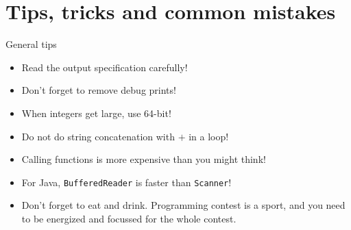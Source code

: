 \documentclass[11pt,pdf, aspectratio=169]{beamer}
\begin{document}
  \section{Tips, tricks and common mistakes}
  \begin{frame}{General tips}
    \begin{itemize}
      \item Read the output specification carefully!
      \item Don’t forget to remove debug prints!
      \item When integers get large, use 64-bit!
      \item Do not do string concatenation with $+$ in a loop!
      \item Calling functions is more expensive than you might think!
      \item For Java, \texttt{BufferedReader} is faster than \texttt{Scanner}!
      \item Don’t forget to eat and drink.
      Programming contest is a sport, and you need to be energized and focussed for the whole contest.
    \end{itemize}
  \end{frame}
\end{document}
